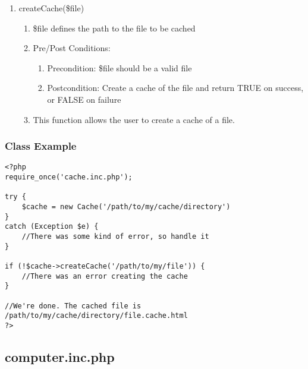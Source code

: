 \documentclass{article}
\begin{document}
\begin{enumerate}
\item createCache(\$file)
\begin{enumerate}
\item \$file defines the path to the file to be cached
\item Pre/Post Conditions:
\begin{enumerate}
\item Precondition: \$file should be a valid file
\item Postcondition: Create a cache of the file and return TRUE on success, or FALSE on failure
\end{enumerate}
\item This function allows the user to create a cache of a file.
\end{enumerate}
\end{enumerate}
\newpage
\subsubsection{Class Example}
\begin{lstlisting}
<?php
require_once('cache.inc.php');

try {
	$cache = new Cache('/path/to/my/cache/directory')
}
catch (Exception $e) {
	//There was some kind of error, so handle it
}

if (!$cache->createCache('/path/to/my/file')) {
	//There was an error creating the cache
}

//We're done. The cached file is /path/to/my/cache/directory/file.cache.html
?>
\end{lstlisting}

\newpage

\subsection{computer.inc.php}
\end{document}
